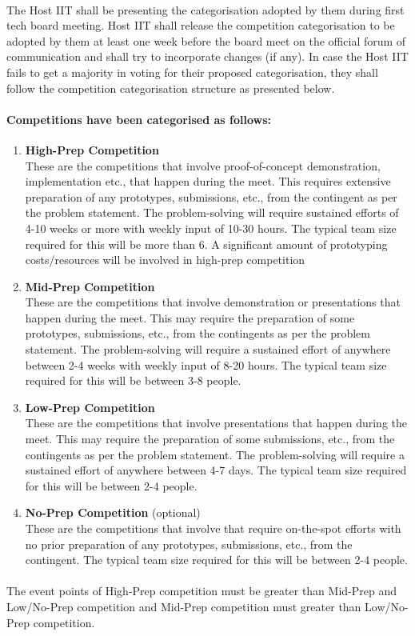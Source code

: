 \paragraph{}
The Host IIT shall be presenting the categorisation adopted by them during first tech board meeting. Host IIT shall release the competition categorisation to be adopted by them at least one week before the board meet on the official forum of communication and shall try to incorporate changes (if any). In case the Host IIT fails to get a majority in voting for their proposed categorisation, they shall follow the competition categorisation structure as presented below.

\paragraph{Competitions have been categorised as follows:}
\begin{enumerate}
    \item 
    \textbf{High-Prep Competition}\\
    These are the competitions that involve proof-of-concept demonstration, implementation etc., that happen during the meet. This requires extensive preparation of any prototypes, submissions, etc., from the contingent as per the problem statement. The problem-solving will require sustained efforts of 4-10 weeks or more with weekly input of 10-30 hours. The typical team size required for this will be more than 6. A significant amount of prototyping costs/resources will be involved in high-prep competition
    \item 
    \textbf{Mid-Prep Competition}\\
    These are the competitions that involve demonstration or presentations that happen during the meet. This may require the preparation of some prototypes, submissions, etc., from the contingents as per the problem statement. The problem-solving will require a sustained effort of anywhere between 2-4 weeks with weekly input of 8-20 hours. The typical team size required for this will be between 3-8 people.
    \item 
    \textbf{Low-Prep Competition}\\
    These are the competitions that involve presentations that happen during the meet. This may require the preparation of some submissions, etc., from the contingents as per the problem statement. The problem-solving will require a sustained effort of anywhere between 4-7 days. The typical team size required for this will be between 2-4 people.
    \item 
    \textbf{No-Prep Competition} (optional)\\
    These are the competitions that involve that require on-the-spot efforts with no prior preparation of any prototypes, submissions, etc., from the contingent. The typical team size required for this will be between 2-4 people.
\end{enumerate}

\paragraph{}
The event points of High-Prep competition must be greater than Mid-Prep and Low/No-Prep competition and Mid-Prep competition must greater than Low/No-Prep competition.